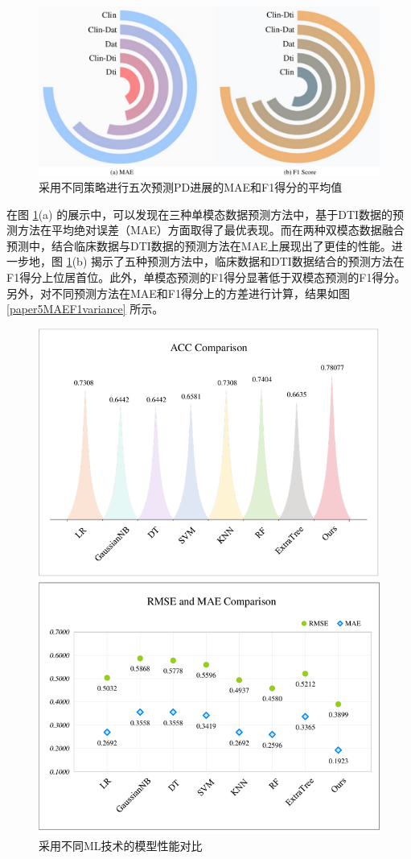    \begin{figure}[ht]
      \centering
      \includegraphics[width=0.95\linewidth]{figs/paper5MAEF1SCORE.pdf}
      \caption{采用不同策略进行五次预测PD进展的MAE和F1得分的平均值}\label{paper5MAEF1}
     \end{figure}

在图 \ref{paper5MAEF1}(a) 的展示中，可以发现在三种单模态数据预测方法中，基于DTI数据的预测方法在平均绝对误差（MAE）方面取得了最优表现。而在两种双模态数据融合预测中，结合临床数据与DTI数据的预测方法在MAE上展现出了更佳的性能。进一步地，图 \ref{paper5MAEF1}(b) 揭示了五种预测方法中，临床数据和DTI数据结合的预测方法在F1得分上位居首位。此外，单模态预测的F1得分显著低于双模态预测的F1得分。另外，对不同预测方法在MAE和F1得分上的方差进行计算，结果如图 \ref{paper5MAEF1variance} 所示。

    \begin{figure}[h]
      \centering
      \includegraphics[width=0.7\linewidth]{figs/paper5accemsemae.pdf}
      \caption{采用不同ML技术的模型性能对比}\label{paper5accemsemae}
     \end{figure}
\fi
     
